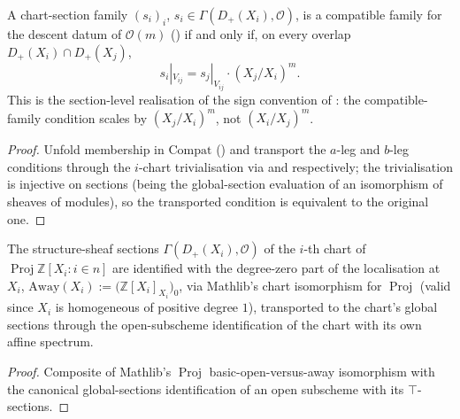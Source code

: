 \begin{lemma}\leanok
  \label{lem:serre_twist_compatible_condition}
  A chart-section family \((s_i)_i\), \(s_i \in \Gamma(D_+(X_i), \mathcal O)\),
  is a compatible family for the descent datum of \(\mathcal O(m)\)
  () if and only if, on every overlap
  \(D_+(X_i) \cap D_+(X_j)\),
  \[
    s_i|_{V_{ij}} = s_j|_{V_{ij}} \cdot (X_j/X_i)^m .
  \]
  This is the section-level realisation of the sign convention of
  : the compatible-family condition scales by
  \((X_j/X_i)^m\), not \((X_i/X_j)^m\).
\end{lemma}
\begin{proof}\leanok
  Unfold membership in \(\mathrm{Compat}\) ()
  and transport the \(a\)-leg and \(b\)-leg conditions through the
  \(i\)-chart trivialisation via  and
   respectively; the trivialisation is injective
  on sections (being the global-section evaluation of an isomorphism of
  sheaves of modules), so the transported condition is equivalent to the
  original one.
\end{proof}

\begin{definition}\leanok
  \label{def:chart_sections_away}
  The structure-sheaf sections \(\Gamma(D_+(X_i), \mathcal O)\) of the
  \(i\)-th chart of \(\operatorname{Proj} \mathbb Z[X_i : i \in n]\) are
  identified with the degree-zero part of the localisation at \(X_i\),
  \(\mathrm{Away}(X_i) := \bigl(\mathbb Z[X_i]_{X_i}\bigr)_0\), via Mathlib's
  chart isomorphism for \(\operatorname{Proj}\) (valid since \(X_i\) is
  homogeneous of positive degree \(1\)), transported to the chart's global
  sections through the open-subscheme identification of the chart with its
  own affine spectrum.
\end{definition}
\begin{proof}\leanok
  Composite of Mathlib's \(\operatorname{Proj}\) basic-open-versus-away
  isomorphism with the canonical global-sections identification of an open
  subscheme with its \(\top\)-sections.
\end{proof}


